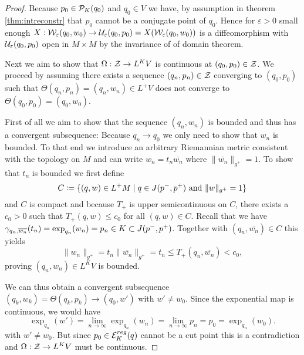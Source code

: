\begin{proof}
    Because $p_0\in {\mathcal{P}}_K(q_0)$ and $q_0\in V$ we have, by assumption in theorem \ref{thm:intreconstr} that $p_0$ cannot be a conjugate point of $q_0$. Hence for $\varepsilon>0$ small enough $X:{\mathcal{W}}_{\varepsilon}(q_0,w_0)\to {\mathcal{U}}_{\varepsilon}(q_0,p_0) = X({\mathcal{W}}_{\varepsilon}(q_0,w_0))$ is a diffeomorphism with ${\mathcal{U}}_{\varepsilon}(q_0,p_0)$ open in $M\times M$ by the invariance of of domain theorem. 
    
    Next we aim to show that $\Omega:{\mathcal{Z}}\to L^KV$ is continuous at $(q_0,p_0)\in {\mathcal{Z}}$. We proceed by assuming there exists a sequence $(q_n,p_n)\in {\mathcal{Z}}$ converging to $(q_0,p_0)$ such that $\Theta(q_n,p_n)=(q_n,w_n)\in L^+V$ does not converge to $\Theta(q_0,p_0)=(q_0,w_0)$.

    First of all we aim to show that the sequence $(q_n,w_n)$ is bounded and thus has a convergent subsequence: Because $q_n\to q_0$ we only need to show that $w_n$ is bounded. To that end we introduce an arbitrary Riemannian metric consistent with the topology on $M$ and can write $w_n = t_n \overline{w_n}$ where $\lVert \overline{w_n} \rVert_{g^+}=1$. To show that $t_n$ is bounded we first define 
    \[
        C\coloneqq \{(q,w)\in L^+M \mid q\in J(p^-,p^+) \text{ and } \lVert w \rVert_{g^+}=1\}
    \]
    and $C$ is compact and because $T_+$ is upper semicontinuous on $C$, there exists a $c_0>0$ such that $T_+(q,w)\leq c_0$ for all $(q,w)\in C$.
    Recall that we have $\gamma_{q_n,\overline{w_n}}(t_n)=\exp_{q_n}(w_n)=p_n \in K \subset J(p^-,p^+)$. Together with $(q_n,\overline{w_n}) \in C$ this yields 
    \[
        \lVert w_n \rVert_{g^+} = t_n\lVert \overline{w_n} \rVert_{g^+} = t_n \leq T_{+}(q_n,\overline{w_n})<c_0,
    \] proving $(q_n,w_n) \in L^KV$ is bounded.

    We can thus obtain a convergent subsequence $(q_k,w_k)=\Theta(q_k,p_k)\to (q_0,w')$ with $w'\neq w_0$. Since the exponential map is continuous, we would have 
    \[
        \exp_{q_n}(w') = \lim_{n\to \infty} \exp_{q_n}(w_n) = \lim_{n\to\infty} p_n = p_0 = \exp_{q_n}(w_0).
    \] with $w'\neq w_0$. But since $p_0\in {{\mathcal{E}}^{reg}_K}(q)$ cannot be a cut point this is a contradiction and $\Omega:{\mathcal{Z}}\to L^KV$ must be continuous.
    

\end{proof}
